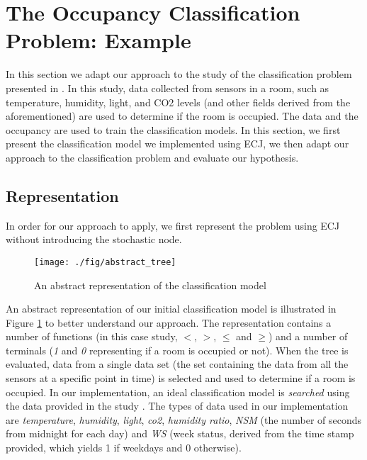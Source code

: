 \section{The Occupancy Classification Problem: Example}

In this section we adapt our approach to the study of the classification problem presented in \cite{}. In this study, data collected from sensors in a room, such as temperature, humidity, light, and CO2 levels (and other fields derived from the aforementioned) are used to determine if the room is occupied. The data and the occupancy are used to train the classification models. In this section, we first present the classification model we implemented using ECJ, we then adapt our approach to the classification problem and evaluate our hypothesis.

\subsection{Representation}
In order for our approach to apply, we first represent the problem using ECJ without introducing the stochastic node. 

\begin{figure}[ht!]
	\centering
	\texttt{[image: ./fig/abstract\_tree]}
	\caption{An abstract representation of the classification model}
	\label{fig:class_abstract-tree}
\end{figure}

An abstract representation of our initial classification model is illustrated in Figure \ref{fig:class_abstract-tree} to better understand our approach. The representation contains a number of functions (in this case study, $<$, $>$, $\leq$ and $\geq$) and a number of terminals (\emph{1} and \emph{0} representing if a room is occupied or not). When the tree is evaluated, data from a single data set (the set containing the data from all the sensors at a specific point in time) is selected and used to determine if a room is occupied. In our implementation, an ideal classification model is \emph{searched} using the data provided in the study \cite{}. The types of data used in our implementation are \emph{temperature}, \emph{humidity}, \emph{light}, \emph{co2}, \emph{humidity ratio}, \emph{NSM} (the number of seconds from midnight for each day) and \emph{WS} (week status, derived from the time stamp provided, which yields 1 if weekdays and 0 otherwise).


